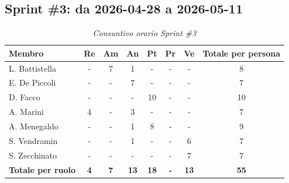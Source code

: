 \documentclass[a4paper, 10pt, colorlinks=true, linkcolor=black, urlcolor=blue, citecolor=blue, hidelinks]{article}
\renewcommand{\arraystretch}{1.2}
\begin{document}
\subsection{Sprint \#3: da 2026-04-28 a 2026-05-11}

\begin{table}[H]
    \centering
    \renewcommand{\arraystretch}{1.4}
    \begin{tabular}{|l|c|c|c|c|c|c|c|}
        \hline
        \rowcolor{bluBitless!15}
        \textbf{Membro} & \textbf{Re} & \textbf{Am} & \textbf{An} & \textbf{Pt} & \textbf{Pr} & \textbf{Ve} & \textbf{Totale per persona} \\
        \hline
        L. Battistella & - & 7 & 1 & - & - & - & 8 \\ \hline
        E. De Piccoli & - & - & 7 & - & - & - & 7 \\ \hline
        D. Facco & - & - & - & 10 & - & - & 10 \\ \hline
        A. Marini & 4 & - & 3 & - & - & - & 7 \\ \hline
        A. Menegaldo & - & - & 1 & 8 & - & - & 9 \\ \hline
        S. Vendramin & - & - & 1 & - & - & 6 & 7 \\ \hline
        S. Zecchinato & - & - & - & - & - & 7 & 7 \\ \hline
        \rowcolor{bluBitless!8}
        \textbf{Totale per ruolo} & \textbf{4} & \textbf{7} & \textbf{13} & \textbf{18} & \textbf{-} & \textbf{13} & \textbf{55} \\
        \hline
    \end{tabular}
    \caption{\textit{Consuntivo orario Sprint \#3}}
\end{table}
\end{document}
